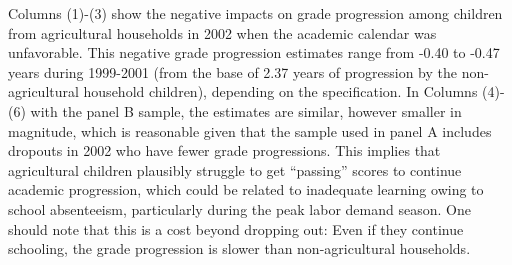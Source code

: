\documentclass[12pt,letterpaper]{article}
\newcommand{\0}{\ensuremath{\mbox{\boldmath $0$}}}
\begin{document}
Columns (1)-(3) show the negative impacts on grade progression among children from agricultural households in 2002 when the academic calendar was unfavorable. This negative grade progression estimates range from -0.40 to -0.47 years during 1999-2001 (from the base of 2.37 years of progression by the non-agricultural household children), depending on the specification. In Columns (4)-(6) with the panel B sample, the estimates are similar, however smaller in magnitude, which is reasonable given that the sample used in panel A includes dropouts in 2002 who have fewer grade progressions. This implies that agricultural children plausibly struggle to get ``passing'' scores to continue academic progression, which could be related to inadequate learning owing to school absenteeism, particularly during the peak labor demand season. One should note that this is a cost beyond dropping out: Even if they continue schooling, the grade progression is slower than non-agricultural households.
\end{document}
